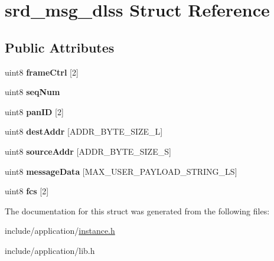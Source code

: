 \hypertarget{structsrd__msg__dlss}{\section{srd\-\_\-msg\-\_\-dlss Struct Reference}
\label{structsrd__msg__dlss}
}
\subsection*{Public Attributes}
\begin{DoxyCompactItemize}
\item 
\hypertarget{structsrd__msg__dlss_ab7a7cd1e23493a7215b53d878561617c}{uint8 {\bfseries frame\-Ctrl} \mbox{[}2\mbox{]}}\label{structsrd__msg__dlss_ab7a7cd1e23493a7215b53d878561617c}

\item 
\hypertarget{structsrd__msg__dlss_a512200525fd16d80bd47a650d224f874}{uint8 {\bfseries seq\-Num}}\label{structsrd__msg__dlss_a512200525fd16d80bd47a650d224f874}

\item 
\hypertarget{structsrd__msg__dlss_af19c4717c8f47c1f395499985a431f91}{uint8 {\bfseries pan\-I\-D} \mbox{[}2\mbox{]}}\label{structsrd__msg__dlss_af19c4717c8f47c1f395499985a431f91}

\item 
\hypertarget{structsrd__msg__dlss_a7b77cc2e93fa46a39785008f379144d2}{uint8 {\bfseries dest\-Addr} \mbox{[}A\-D\-D\-R\-\_\-\-B\-Y\-T\-E\-\_\-\-S\-I\-Z\-E\-\_\-\-L\mbox{]}}\label{structsrd__msg__dlss_a7b77cc2e93fa46a39785008f379144d2}

\item 
\hypertarget{structsrd__msg__dlss_ae1e2eebf68d4ac3bedad7833ed53c697}{uint8 {\bfseries source\-Addr} \mbox{[}A\-D\-D\-R\-\_\-\-B\-Y\-T\-E\-\_\-\-S\-I\-Z\-E\-\_\-\-S\mbox{]}}\label{structsrd__msg__dlss_ae1e2eebf68d4ac3bedad7833ed53c697}

\item 
\hypertarget{structsrd__msg__dlss_a08d6db667f2a0884c60292662c4a0e7e}{uint8 {\bfseries message\-Data} \mbox{[}M\-A\-X\-\_\-\-U\-S\-E\-R\-\_\-\-P\-A\-Y\-L\-O\-A\-D\-\_\-\-S\-T\-R\-I\-N\-G\-\_\-\-L\-S\mbox{]}}\label{structsrd__msg__dlss_a08d6db667f2a0884c60292662c4a0e7e}

\item 
\hypertarget{structsrd__msg__dlss_af3e159d8f3fb80263cbc977ada7bc998}{uint8 {\bfseries fcs} \mbox{[}2\mbox{]}}\label{structsrd__msg__dlss_af3e159d8f3fb80263cbc977ada7bc998}

\end{DoxyCompactItemize}


The documentation for this struct was generated from the following files\-:\begin{DoxyCompactItemize}
\item 
include/application/\hyperlink{instance_8h}{instance.\-h}\item 
include/application/lib.\-h\end{DoxyCompactItemize}

